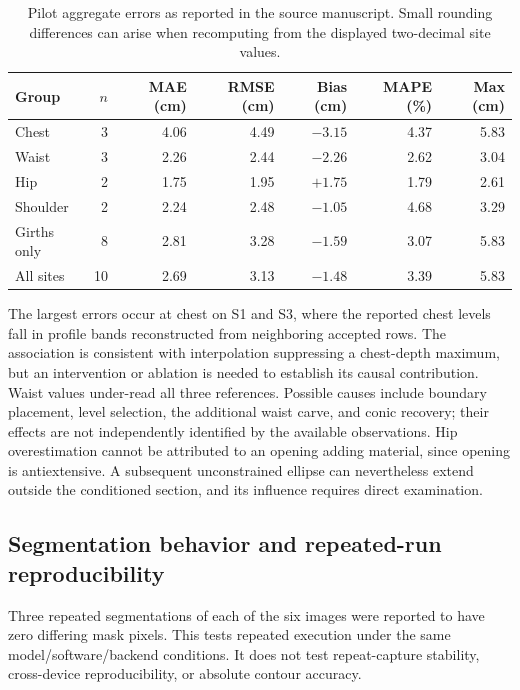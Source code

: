 \begin{table}[htbp]
\centering\small
\caption{Pilot aggregate errors as reported in the source manuscript. Small rounding differences can arise when recomputing from the displayed two-decimal site values.}
\label{tab:aggregate_error}
\begin{tabular}{lrrrrrr}
\toprule
Group & $n$ & MAE (cm) & RMSE (cm) & Bias (cm) & MAPE (\%) & Max (cm) \\
\midrule
Chest & 3 & 4.06 & 4.49 & $-3.15$ & 4.37 & 5.83 \\
Waist & 3 & 2.26 & 2.44 & $-2.26$ & 2.62 & 3.04 \\
Hip & 2 & 1.75 & 1.95 & $+1.75$ & 1.79 & 2.61 \\
Shoulder & 2 & 2.24 & 2.48 & $-1.05$ & 4.68 & 3.29 \\
Girths only & 8 & 2.81 & 3.28 & $-1.59$ & 3.07 & 5.83 \\
All sites & 10 & 2.69 & 3.13 & $-1.48$ & 3.39 & 5.83 \\
\bottomrule
\end{tabular}
\end{table}

The largest errors occur at chest on S1 and S3, where the reported chest levels fall in profile bands reconstructed from neighboring accepted rows. The association is consistent with interpolation suppressing a chest-depth maximum, but an intervention or ablation is needed to establish its causal contribution. Waist values under-read all three references. Possible causes include boundary placement, level selection, the additional waist carve, and conic recovery; their effects are not independently identified by the available observations. Hip overestimation cannot be attributed to an opening adding material, since opening is antiextensive. A subsequent unconstrained ellipse can nevertheless extend outside the conditioned section, and its influence requires direct examination.

\subsection{Segmentation behavior and repeated-run reproducibility}
Three repeated segmentations of each of the six images were reported to have zero differing mask pixels. This tests repeated execution under the same model/software/backend conditions. It does not test repeat-capture stability, cross-device reproducibility, or absolute contour accuracy.

